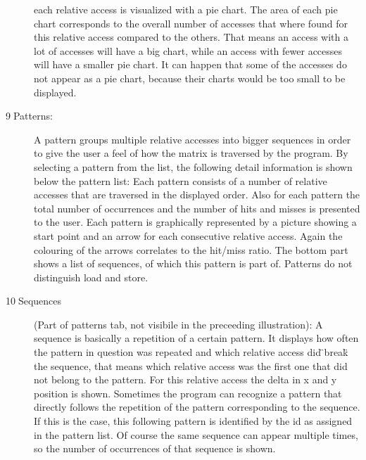 \begin{description}
each relative access is visualized with a pie chart. The area of each
pie chart corresponds to the overall number of accesses that where
found for this relative access compared to the others. That means
an access with a lot of accesses will have a big chart, while an access
with fewer accesses will have a smaller pie chart. It can happen that
some of the accesses do not appear as a pie chart, because their charts
would be too small to be displayed.
\item [{9$\;$Patterns:}] A pattern groups multiple relative accesses
into bigger sequences in order to give the user a feel of how the matrix
is traversed by the program. By selecting a pattern from the list,
the following detail information is shown below the pattern list:
Each pattern consists of a number of relative accesses that are traversed
in the displayed order. Also for each pattern the total number of
occurrences and the number of hits and misses is presented to the
user. Each pattern is graphically represented by a picture showing
a start point and an arrow for each consecutive relative access. Again
the colouring of the arrows correlates to the hit/miss ratio. The
bottom part shows a list of sequences, of which this pattern is part
of. Patterns do not distinguish load and store.
\item [{10$\;$Sequences}] (Part of patterns tab, not visibile in the preceeding
illustration): A sequence is basically a repetition of a certain pattern.
It displays how often the pattern in question was repeated and which
relative access did \"{}break\"{} the sequence,
that means which relative access was the first one that did not belong
to the pattern. For this relative access the delta in x and y position
is shown. Sometimes the program can recognize a pattern that directly
follows the repetition of the pattern corresponding to the sequence.
If this is the case, this following pattern is identified by the id
as assigned in the pattern list. Of course the same sequence can appear
multiple times, so the number of occurrences of that sequence is shown.\end{description}
